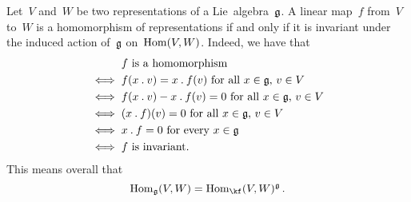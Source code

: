 \begin{remark}
  \label{homomorphisms of representations as invariants}
  Let~$V$ and~$W$ be two representations of a Lie~algebra~$\mathfrak{g}$.
  A linear map~$f$ from~$V$ to~$W$ is a homomorphism of representations if and only if it is invariant under the induced action of~$\mathfrak{g}$ on~$\operatorname{Hom}(V,W)$.
  Indeed, we have that
  \begin{align*}
        {}& \text{$f$ is a homomorphism}  \\
    \iff{}& \text{$f(x \mathbin{.} v) = x \mathbin{.} f(v)$ for all~$x \in \mathfrak{g}$,~$v \in V$}  \\
    \iff{}& \text{$f(x \mathbin{.} v) - x \mathbin{.} f(v) = 0$ for all~$x \in \mathfrak{g}$,~$v \in V$}  \\
    \iff{}& \text{$(x \mathbin{.} f)(v) = 0$ for all~$x \in \mathfrak{g}$,~$v \in V$} \\
    \iff{}& \text{$x \mathbin{.} f = 0$ for every~$x \in \mathfrak{g}$}  \\
    \iff{}& \text{$f$ is invariant.}
  \end{align*}
  This means overall that
  \[
    \Hom_{\glie}(V,W)
    =
    \Hom_{\kf}(V,W)^{\glie} \,.
  \]
\end{remark}


